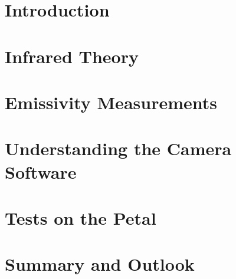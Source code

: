 \documentclass[11pt,oneside,abstracton,a4paper]{article}
\begin{document}
\newpage

\tableofcontents
\newpage
\listoftodos
\newpage
\section{Introduction}


\section{Infrared Theory}


\section{Emissivity Measurements\label{sec:emissivityMeasurement}}

\section{Understanding the Camera Software}

\section{Tests on the Petal}


\clearpage
\section{Summary and Outlook}

\end{document}

